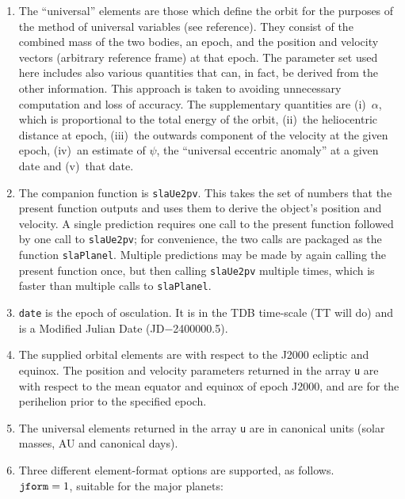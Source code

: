 \documentclass[11pt,fleqn,twoside]{article}
\renewcommand{\_}{{\tt\char'137}}     %
\begin{document}
{
 \begin{enumerate}
  \item The ``universal'' elements are those which define the orbit for
        the purposes of the method of universal variables (see reference).
        They consist of the combined mass of the two bodies, an epoch,
        and the position and velocity vectors (arbitrary reference frame)
        at that epoch.  The parameter set used here includes also various
        quantities that can, in fact, be derived from the other
        information.  This approach is taken to avoiding unnecessary
        computation and loss of accuracy.  The supplementary quantities
        are (i)~$\alpha$, which is proportional to the total energy of the
        orbit, (ii)~the heliocentric distance at epoch,
        (iii)~the outwards component of the velocity at the given epoch,
        (iv)~an estimate of $\psi$, the ``universal eccentric anomaly'' at a
        given date and (v)~that date.
  \item The companion function is {\tt slaUe2pv}.  This takes the set of numbers
        that the present function outputs and uses them to derive the
        object's position and velocity.  A single prediction requires one
        call to the present function followed by one call to {\tt slaUe2pv};
        for convenience, the two calls are packaged as the function
        {\tt slaPlanel}.  Multiple predictions may be made by again calling the
        present function once, but then calling {\tt slaUe2pv} multiple times,
        which is faster than multiple calls to {\tt slaPlanel}.
  \item {\tt date} is the epoch of osculation.  It is in the TDB time-scale
        (TT will do) and is a Modified Julian Date (JD$-$2400000.5).
  \item The supplied orbital elements are with respect to the J2000
        ecliptic and equinox.  The position and velocity parameters
        returned in the array {\tt u}
        are with respect to the mean equator and
        equinox of epoch J2000, and are for the perihelion prior to the
        specified epoch.
  \item The universal elements returned in the array {\tt u}
        are in canonical units (solar masses, AU and canonical days).
  \item Three different element-format options are supported, as
        follows. \\
 
        ${\tt jform}=1$, suitable for the major planets:
 

\end{enumerate}}
\end{document}
